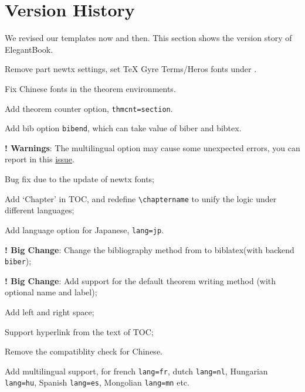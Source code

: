\documentclass[11pt]{elegantbook}
\begin{document}
\chapter{Version History}
We revised our templates now and then. This section shows the version story of ElegantBook.



\begin{change}
  \item Remove part newtx settings, set TeX Gyre Terms/Heros fonts under .
  \item Fix Chinese fonts in the theorem environments.
  \item Add theorem counter option, \lstinline{thmcnt=section}.
  \item Add bib option \lstinline{bibend}, which can take value of biber and bibtex.
  \item \textbf{! Warnings}: The multilingual option may cause some unexpected errors, you can report in this \href{https://github.com/ElegantLaTeX/ElegantBook/issues/170}{issue}.
\end{change}




\begin{change}
  \item Bug fix due to the update of newtx fonts;
  \item Add `Chapter' in TOC, and redefine \lstinline{\chaptername} to unify the logic under different languages;
  \item Add language option for Japanese, \lstinline{lang=jp}.
\end{change}



\begin{change}
  \item \textbf{! Big Change}: Change the bibliography method from  to biblatex(with backend  \lstinline{biber});
  \item \textbf{! Big Change}: Add support for the default theorem writing method (with optional name and label);
  \item Add left and right space;
  \item Support hyperlink from the text of TOC;
  \item Remove the  compatiblity check for Chinese.
  \item Add multilingual support, for french \lstinline{lang=fr}, dutch \lstinline{lang=nl}, Hungarian  \lstinline{lang=hu}, Spanish \lstinline{lang=es}, Mongolian \lstinline{lang=mn} etc.
\end{change}
\end{document}
